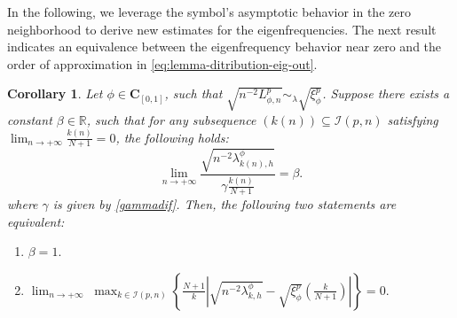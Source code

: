 \documentclass[11pt]{article}
\newtheorem{corollary}{Corollary}[section]
\begin{document}
In the following, we leverage the symbol's asymptotic behavior in the zero neighborhood to derive new estimates for the eigenfrequencies. The next result indicates an  equivalence between the eigenfrequency behavior near zero and the order of approximation in \eqref{eq:lemma-ditribution-eig-out}.
\begin{corollary}\label{equivalenceimportant}
    Let $\phi\in\mathbf{C}_{[0,1]}$, such that $\sqrt{n^{-2}L_{\phi,n}^p}\sim_{\lambda} \sqrt{\xi^p_{\phi}}$. Suppose there exists a constant $\beta\in \mathbb{R}$, such that for any subsequence $(k(n))\subseteq\mathcal{I}(p,n) $ satisfying  $\lim_{n \rightarrow +\infty}\frac{k(n)}{N+1}=0$, the following holds:  
    \begin{equation}\label{assumtiononeigenvaluesnear0}
        \lim_{n \rightarrow +\infty}\frac{\sqrt{n^{-2}\lambda_{k(n),h}^{\phi}}}{\gamma \frac{k(n)}{N+1}}=\beta.
    \end{equation}
    where $\gamma$ is given by \eqref{gammadif}. Then, the  following two statements are equivalent:
  \begin{enumerate}
    \item[(i)] $\beta=1.$
    \item[(ii)] $ \lim_{n \rightarrow +\infty}\;\max_{k \in \mathcal{I}(p,n)} \left\{\frac{N+1}{k}\left|\sqrt{n^{-2}\lambda_{k,h}^{\phi}}-\sqrt{\xi_{\phi}^p}\left(\frac{k}{N+1}\right)\right|\right\}=0.$
\end{enumerate}
\end{corollary}
\end{document}

